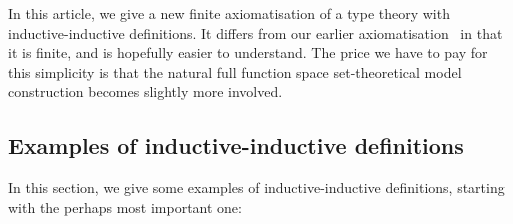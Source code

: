 \documentclass{article}
\begin{document}
In this article, we give a new finite axiomatisation of a type theory
with inductive-inductive definitions. It differs from our earlier
axiomatisation~\cite{nordvallforsbergSetzer2010indind} in that it is
finite, and is hopefully easier to understand. The price we have to pay
for this simplicity is that the natural full function space
set-theoretical model construction becomes slightly more involved.







\subsection{Examples of inductive-inductive definitions}
\label{sec:examples}

In this section, we give some examples of inductive-inductive
definitions, starting with the perhaps most important one:
\end{document}
